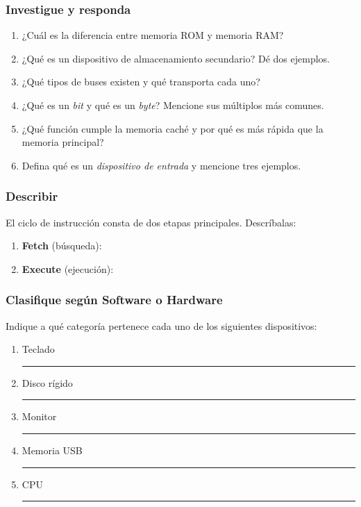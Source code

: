 \subsubsection{Investigue y responda}
\begin{enumerate}[label=\alph*)]
    \item ¿Cuál es la diferencia entre memoria ROM y memoria RAM?  
    \item ¿Qué es un dispositivo de almacenamiento secundario? Dé dos ejemplos.  
    \item ¿Qué tipos de buses existen y qué transporta cada uno?  
    \item ¿Qué es un \textit{bit} y qué es un \textit{byte}? Mencione sus múltiplos más comunes.
    \item ¿Qué función cumple la memoria caché y por qué es más rápida que la memoria principal?
    \item Defina qué es un \textit{dispositivo de entrada} y mencione tres ejemplos.
\end{enumerate}

\subsubsection{Describir}
El ciclo de instrucción consta de dos etapas principales. Descríbalas:
\begin{enumerate}[label=\alph*)]
    \item \textbf{Fetch} (búsqueda): \\
    \vspace{1cm}
    \item \textbf{Execute} (ejecución): \\
    \vspace{1cm}
\end{enumerate}


\subsubsection{Clasifique según Software o Hardware}
Indique a qué categoría pertenece cada uno de los siguientes dispositivos:
\begin{enumerate}[label=\alph*)]
    \item Teclado \hfill \rule{4cm}{0.1pt}
    \item Disco rígido \hfill \rule{4cm}{0.1pt}
    \item Monitor \hfill \rule{4cm}{0.1pt}
    \item Memoria USB \hfill \rule{4cm}{0.1pt}
    \item CPU \hfill \rule{4cm}{0.1pt}
\end{enumerate}


